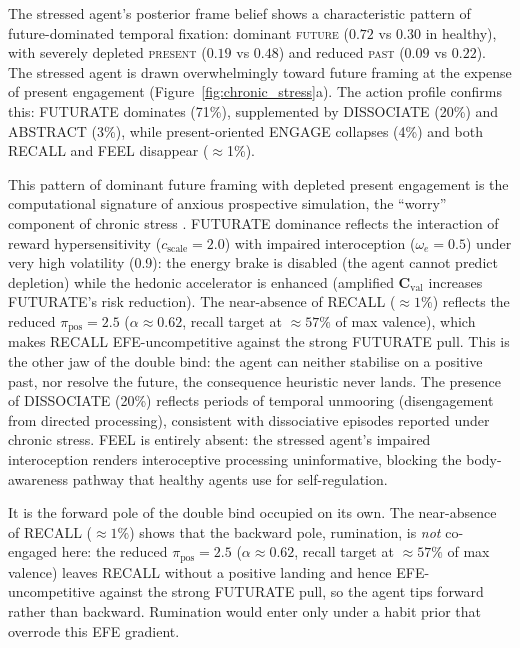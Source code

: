 \documentclass[11pt,a4paper]{article}
\newcommand{\rr}{\color{red!70!black}}
\begin{document}
The stressed agent's posterior frame belief shows a characteristic pattern of future-dominated temporal fixation: dominant \textsc{future} ($0.72$ vs $0.30$ in healthy), with severely depleted \textsc{present} ($0.19$ vs $0.48$) and reduced \textsc{past} ($0.09$ vs $0.22$). The stressed agent is drawn overwhelmingly toward future framing at the expense of present engagement (Figure~\ref{fig:chronic_stress}a). The action profile confirms this: FUTURATE dominates (71\%), supplemented by DISSOCIATE (20\%) and ABSTRACT (3\%), while present-oriented ENGAGE collapses (4\%) and both RECALL and FEEL disappear ($\approx$1\%).

This pattern of dominant future framing with depleted present engagement is the computational signature of anxious prospective simulation, the ``worry'' component of chronic stress \citep{berg2022rumination, fresco2002}. 
FUTURATE dominance reflects the interaction of reward hypersensitivity ($c_{\text{scale}} = 2.0$) with impaired interoception ($\omega_e = 0.5$) under very high volatility (0.9): the energy brake is disabled (the agent cannot predict depletion) while the hedonic accelerator is enhanced (amplified $\mathbf{C}_{\text{val}}$ increases FUTURATE's risk reduction). The near-absence of RECALL ($\approx 1\%$) reflects the reduced $\pi_{\text{pos}} = 2.5$ ($\alpha \approx 0.62$, recall target at $\approx 57\%$ of max valence), which makes RECALL EFE-uncompetitive against the strong FUTURATE pull. {\rr This is the other jaw of the double bind: the agent can neither stabilise on a positive past, nor resolve the future, the consequence heuristic never lands.} The presence of DISSOCIATE (20\%) reflects periods of temporal unmooring (disengagement from directed processing), consistent with dissociative episodes reported under chronic stress. FEEL is entirely absent: the stressed agent's impaired interoception renders interoceptive processing uninformative, blocking the body-awareness pathway that healthy agents use for self-regulation.

It is the forward pole of the double bind occupied on its own. The near-absence of RECALL ($\approx 1\%$) shows that the backward pole, rumination, is \emph{not} co-engaged here: the reduced $\pi_{\text{pos}} = 2.5$ ($\alpha \approx 0.62$, recall target at $\approx 57\%$ of max valence) leaves RECALL without a positive landing and hence EFE-uncompetitive against the strong FUTURATE pull, so the agent tips forward rather than backward. Rumination would enter only under a habit prior that overrode this EFE gradient.
\end{document}

